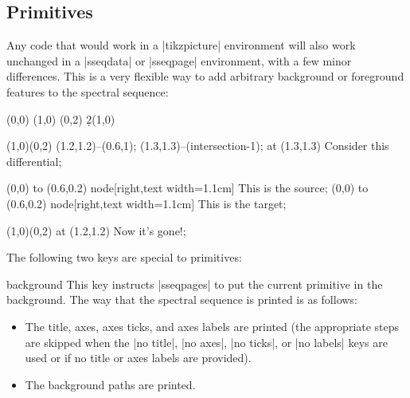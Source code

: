 \documentclass{ltxdoc}
\begin{document}
\begin{sseqdata}[name=ex1,degree={#1}{1-#1}]
\subsection{\tikzname\space Primitives}
Any code that would work in a |tikzpicture| environment will also work unchanged in a |sseqdata| or |sseqpage| environment, with a few minor differences. This is a very flexible way to add arbitrary background or foreground features to the spectral sequence:
\begin{codeexample}[]
\begin{sseqdata}[name=tikz example,Adams grading,x range={0}{2}, x axis extend end=2em,math nodes=false]
\class(0,0)
\class(1,0)
\class(0,2)
\d2(1,0)
\end{sseqdata}
%
\begin{sseqpage}[name=tikz example,sseq={blue,font=\tiny}]
\circleclasses[name path=myellipse,inner sep=3pt,ellipse ratio=1.6] (1,0)(0,2)
\path[name path=myline](1.2,1.2)--(0.6,1);
\draw[->,name intersections={of=myellipse and myline}] (1.3,1.3)--(intersection-1);
\node[right,text width=1.6cm] at (1.3,1.3) {Consider this differential};
\end{sseqpage}
%
\begin{sseqpage}[name=tikz example,sseq={<-,blue,font=\tiny}]
\draw[xshift=1](0,0) to (0.6,0.2) node[right,text width=1.1cm] {This is the source};
\draw[yshift=2](0,0) to (0.6,0.2) node[right,text width=1.1cm] {This is the target};
\end{sseqpage}
%
\begin{sseqpage}[page=3,name=tikz example]
\circleclasses[name path=myellipse,inner sep=3pt,ellipse ratio=1.6] (1,0)(0,2)
\node[right,font=\tiny] at (1.2,1.2) {Now it's gone!};
\end{sseqpage}
\end{codeexample}

The following two keys are special to \tikzname\space primitives:
\begin{key}{background}
This key instructs |sseqpages| to put the current \tikzname\space primitive in the background. The way that the spectral sequence is printed is as follows:
\begin{itemize}
\item The title, axes, axes ticks, and axes labels are printed (the appropriate steps are skipped when the |no title|, |no axes|, |no ticks|, or |no labels| keys are used or if no title or axes labels are provided).

\item The \tikzname\space background paths are printed.


\end{itemize}
\end{key}
\end{sseqdata}
\end{document}
